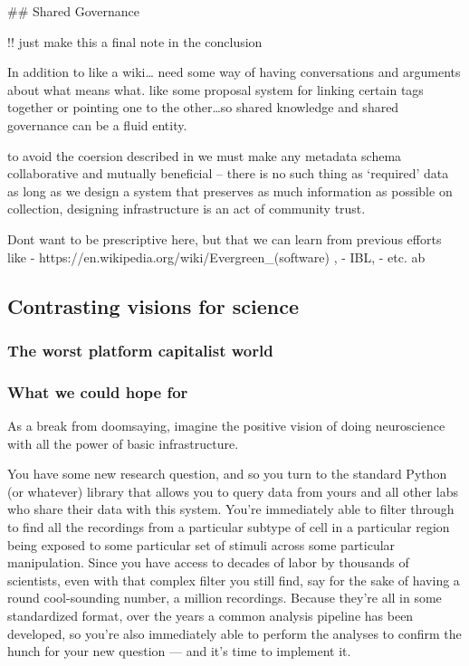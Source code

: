 \documentclass[11pt]{article}
\begin{document}
\begin{multicols}{2}
 \#\# Shared Governance

!! just make this a final note in the conclusion

In addition to like a wiki\ldots{} need some way of having conversations
and arguments about what means what. like some proposal system for
linking certain tags together or pointing one to the other\ldots so
shared knowledge and shared governance can be a fluid entity.

to avoid the coersion described in \cite{bietzCollaborationMetagenomicsSequence2009}  we must make any
metadata schema collaborative and mutually beneficial -- there is no
such thing as `required' data as long as we design a system that
preserves as much information as possible on collection, designing
infrastructure is an act of community trust.

Dont want to be prescriptive here, but that we can learn from previous
efforts like - https://en.wikipedia.org/wiki/Evergreen\_(software) , -
IBL, - etc. ab

\hypertarget{contrasting-visions-for-science}{%
\subsection{Contrasting visions for
science}\label{contrasting-visions-for-science}}

\hypertarget{the-worst-platform-capitalist-world}{%
\subsubsection{The worst platform capitalist
world}\label{the-worst-platform-capitalist-world}}

\hypertarget{what-we-could-hope-for}{%
\subsubsection{What we could hope for}\label{what-we-could-hope-for}}

As a break from doomsaying, imagine the positive vision of doing
neuroscience with all the power of basic infrastructure.

You have some new research question, and so you turn to the standard
Python (or whatever) library that allows you to query data from yours
and all other labs who share their data with this system. You're
immediately able to filter through to find all the recordings from a
particular subtype of cell in a particular region being exposed to some
particular set of stimuli across some particular manipulation. Since you
have access to decades of labor by thousands of scientists, even with
that complex filter you still find, say for the sake of having a round
cool-sounding number, a million recordings. Because they're all in some
standardized format, over the years a common analysis pipeline has been
developed, so you're also immediately able to perform the analyses to
confirm the hunch for your new question --- and it's time to implement
it.


\end{multicols}
\end{document}

